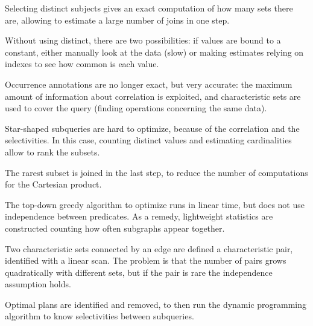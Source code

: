 Selecting distinct subjects gives an exact computation of how many sets there are, allowing to estimate a large number of joins in one step.

Without using distinct, there are two possibilities: if values are bound to a constant, either manually look at the data (slow) or making estimates relying on indexes to see how common is each value.

Occurrence annotations are no longer exact, but very accurate: the maximum amount of information about correlation is exploited, and characteristic sets are used to cover the query (finding operations concerning the same data).

Star-shaped subqueries are hard to optimize, because of the correlation and the selectivities. In this case, counting distinct values and estimating cardinalities allow to rank the subsets.

The rarest subset is joined in the last step, to reduce the number of computations for the Cartesian product.

The top-down greedy algorithm to optimize runs in linear time, but does not use independence between predicates. As a remedy, lightweight statistics are constructed counting how often subgraphs appear together. 

Two characteristic sets connected by an edge are defined a characteristic pair, identified with a linear scan. The problem is that the number of pairs grows quadratically with different sets, but if the pair is rare the independence assumption holds.

Optimal plans are identified and removed, to then run the dynamic programming algorithm to know selectivities between subqueries.


